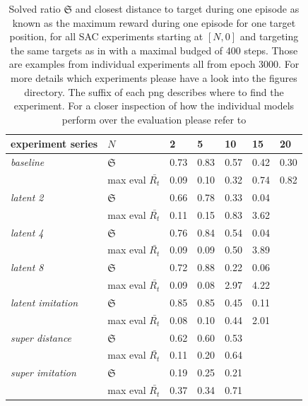 \begin{table}
    \begin{center}
        \begin{tabular}{ l l | l l l l l}
        experiment series           & $N$                   & 2    & 5    & 10   & 15   & 20   \\
        \hline
        \hline
        \textit{baseline}           & $\mathfrak{S}$        & 0.73 & 0.83 & 0.57 & 0.42 & 0.30 \\
                                    & max eval $\bar{R_t}$  & 0.09 & 0.10 & 0.32 & 0.74 & 0.82 \\
        \hline
        \textit{latent 2}           & $\mathfrak{S}$        & 0.66 & 0.78 & 0.33 & 0.04 &      \\
                                    & max eval $\bar{R_t}$  & 0.11 & 0.15 & 0.83 & 3.62 &      \\
        \hline
        \textit{latent 4}           & $\mathfrak{S}$        & 0.76 & 0.84 & 0.54 & 0.04 &      \\
                                    & max eval $\bar{R_t}$  & 0.09 & 0.09 & 0.50 & 3.89 &      \\
        \hline
        \textit{latent 8}           & $\mathfrak{S}$        & 0.72 & 0.88 & 0.22 & 0.06 &      \\
                                    & max eval $\bar{R_t}$  & 0.09 & 0.08 & 2.97 & 4.22 &      \\
        \hline
        \textit{latent imitation}   & $\mathfrak{S}$        & 0.85 & 0.85 & 0.45 & 0.11 &      \\
                                    & max eval $\bar{R_t}$  & 0.08 & 0.10 & 0.44 & 2.01 &      \\
        \hline
        \textit{super distance}     & $\mathfrak{S}$        & 0.62 & 0.60 & 0.53 &      &      \\
                                    & max eval $\bar{R_t}$  & 0.11 & 0.20 & 0.64 &      &      \\
        \hline
        \textit{super imitation}    & $\mathfrak{S}$        & 0.19 & 0.25 & 0.21 &      &      \\
                                    & max eval $\bar{R_t}$  & 0.37 & 0.34 & 0.71 &      &      \\
    \end{tabular}
    \end{center}
    \caption[SAC Solved ratio]{Solved ratio $\mathfrak{S}$ and closest distance to target during one episode as known as the maximum reward during one episode for one target position, for all SAC experiments starting at $[N, 0]$ and targeting the same targets as in  with a maximal budged of 400 steps. Those are examples from individual experiments all from epoch 3000. For more details which experiments please have a look into the figures directory. The suffix of each png describes where to find the experiment. For a closer inspection of how the individual models perform over the evaluation please refer to }
    \label{tab:SAC_solved_ratio}
\end{table}

